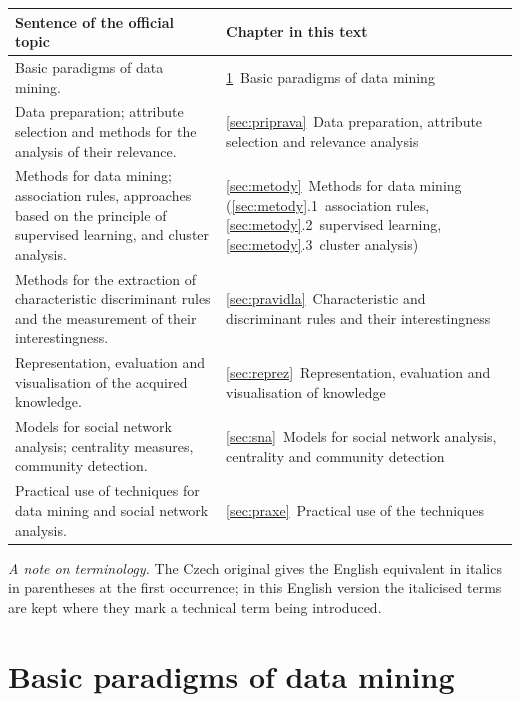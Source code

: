 \documentclass[11pt,a4paper]{article}
\theoremstyle{definition}
\begin{document}
\begin{center}
\small
\begin{tabular}{@{}>{\raggedright\arraybackslash}p{8.6cm}>{\raggedright\arraybackslash}p{7.4cm}@{}}
\toprule
\textbf{Sentence of the official topic} & \textbf{Chapter in this text} \\
\midrule
Basic paradigms of data mining.
  & \ref{sec:paradigmata}~Basic paradigms of data mining \\
Data preparation; attribute selection and methods for the analysis of their relevance.
  & \ref{sec:priprava}~Data preparation, attribute selection and relevance analysis \\
Methods for data mining; association rules, approaches based on the principle of
supervised learning, and cluster analysis.
  & \ref{sec:metody}~Methods for data mining (\ref{sec:metody}.1~association rules,
    \ref{sec:metody}.2~supervised learning, \ref{sec:metody}.3~cluster analysis) \\
Methods for the extraction of characteristic discriminant rules and the measurement of their
interestingness.
  & \ref{sec:pravidla}~Characteristic and discriminant rules and their interestingness \\
Representation, evaluation and visualisation of the acquired knowledge.
  & \ref{sec:reprez}~Representation, evaluation and visualisation of knowledge \\
Models for social network analysis; centrality measures, community detection.
  & \ref{sec:sna}~Models for social network analysis, centrality and community detection \\
Practical use of techniques for data mining and social network analysis.
  & \ref{sec:praxe}~Practical use of the techniques \\
\bottomrule
\end{tabular}
\end{center}

\vspace{1mm}
\noindent\small\textit{A note on terminology.} The Czech original gives the English equivalent
in italics in parentheses at the first occurrence; in this English version the italicised terms
are kept where they mark a technical term being introduced.\normalsize

\vspace{2mm}
\tableofcontents
\newpage

\section{Basic paradigms of data mining}
\label{sec:paradigmata}
\end{document}

